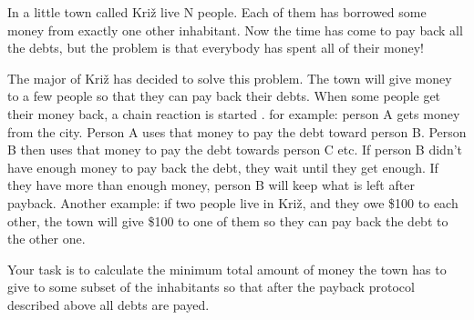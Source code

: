 In a little town called Križ live N people. Each of them has borrowed some money from exactly one other inhabitant. Now the time has come to pay back all the debts, but the problem is that everybody  has spent all of their money!  

   The major of Križ has decided to solve this problem. The town will give money to a few people so that  they can pay back their debts. When some people get their money back, a chain reaction is started . for  example: person A gets money from the city. Person A uses that money to pay the debt toward person  B. Person B then uses that money to pay the debt towards person C etc. If person B didn’t have  enough money to pay back the debt, they wait until  they get enough. If they have more than enough  money, person B will keep what is left after payback.   Another example: if two people live in Križ, and they owe \$100 to each other, the town will give \$100  to one of them so they can pay back the debt to the other one.  

   Your task is to calculate the minimum total amount of money the town has to give to some subset  of the inhabitants so that after the payback protocol described above all debts are payed.  

\
